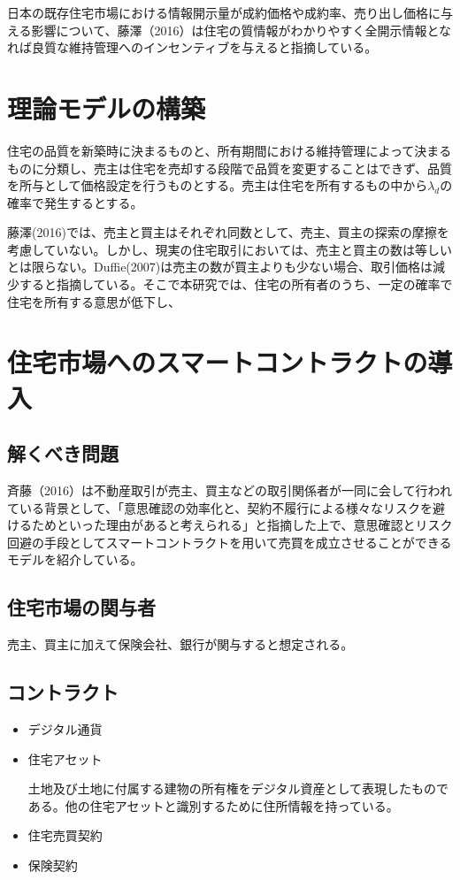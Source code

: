 \documentclass[a4paper,10.5pt]{bxjsarticle}
\begin{document}
日本の既存住宅市場における情報開示量が成約価格や成約率、売り出し価格に与える影響について、藤澤（2016）は住宅の質情報がわかりやすく全開示情報となれば良質な維持管理へのインセンティブを与えると指摘している。
\section{理論モデルの構築}
住宅の品質を新築時に決まるものと、所有期間における維持管理によって決まるものに分類し、売主は住宅を売却する段階で品質を変更することはできず、品質を所与として価格設定を行うものとする。売主は住宅を所有するもの中から$\lambda_{d}$の確率で発生するとする。

藤澤(2016)では、売主と買主はそれぞれ同数として、売主、買主の探索の摩擦を考慮していない。しかし、現実の住宅取引においては、売主と買主の数は等しいとは限らない。Duffie(2007)は売主の数が買主よりも少ない場合、取引価格は減少すると指摘している。そこで本研究では、住宅の所有者のうち、一定の確率で住宅を所有する意思が低下し、

\section{住宅市場へのスマートコントラクトの導入}
\subsection{解くべき問題}
斉藤（2016）は不動産取引が売主、買主などの取引関係者が一同に会して行われている背景として、「意思確認の効率化と、契約不履行による様々なリスクを避けるためといった理由があると考えられる」と指摘した上で、意思確認とリスク回避の手段としてスマートコントラクトを用いて売買を成立させることができるモデルを紹介している。

\subsection{住宅市場の関与者}
売主、買主に加えて保険会社、銀行が関与すると想定される。

\subsection{コントラクト}
\begin{itemize}
\item デジタル通貨
\item 住宅アセット

土地及び土地に付属する建物の所有権をデジタル資産として表現したものである。他の住宅アセットと識別するために住所情報を持っている。
\item 住宅売買契約
\item 保険契約

\end{itemize}
\end{document}
